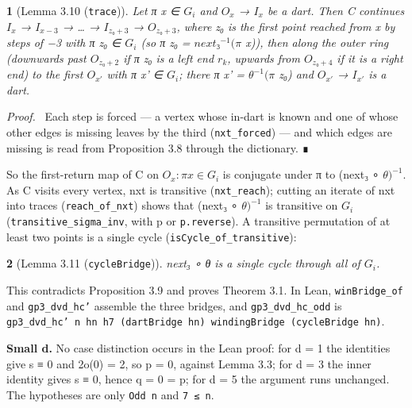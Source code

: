 \documentclass[11pt,a4paper]{article}
\theoremstyle{named}
\newtheorem*{namedthm}{}
\newenvironment{mdproof}[1][Proof]{\par\medskip\noindent\textit{#1.}\ }{\par\medskip}
\begin{document}
\begin{namedthm}[Lemma 3.10 (\texttt{trace})]
Let π x ∈ $G_i$ and $O_x$ → $I_x$ be a dart. Then C continues $I_x$ → $I_{x−3}$ → … → $I_{z₀+3}$ → $O_{z₀+3}$, where z₀ is the first point reached from x by steps of −3 with π z₀ ∈ $G_i$ (so π z₀ = $next₃^{−1}(π$ x)), then along the outer ring (downwards past $O_{z₀+2}$ if π z₀ is a left end $r_k$, upwards from $O_{z₀+4}$ if it is a right end) to the first $O_{x'}$ with π x' ∈ $G_i$; there π x' = $θ^{−1}(π$ z₀) and $O_{x'}$ → $I_{x'}$ is a dart.
\end{namedthm}
\begin{mdproof}[Proof]
Each step is forced — a vertex whose in-dart is known and one of whose other edges is missing leaves by the third (\texttt{nxt\_\allowbreak{}forced}) — and which edges are missing is read from Proposition 3.8 through the dictionary. ∎
\end{mdproof}

So the first-return map of C on ${O_x : π x ∈ G_i}$ is conjugate under π to (next₃ ∘ $θ)^{−1}$. As C visits every vertex, nxt is transitive (\texttt{nxt\_\allowbreak{}reach}); cutting an iterate of nxt into traces (\texttt{reach\_\allowbreak{}of\_\allowbreak{}nxt}) shows that (next₃ ∘ $θ)^{−1}$ is transitive on $G_i$ (\texttt{transitive\_\allowbreak{}sigma\_\allowbreak{}inv}, with p or \texttt{p.\allowbreak{}reverse}). A transitive permutation of at least two points is a single cycle (\texttt{isCycle\_\allowbreak{}of\_\allowbreak{}transitive}):

\begin{namedthm}[Lemma 3.11 (\texttt{cycleBridge})]
next₃ ∘ θ is a single cycle through all of $G_i$.
\end{namedthm}

This contradicts Proposition 3.9 and proves Theorem 3.1. In Lean, \texttt{winBridge\_\allowbreak{}of} and \texttt{gp3\_\allowbreak{}dvd\_\allowbreak{}hc'} assemble the three bridges, and \texttt{gp3\_\allowbreak{}dvd\_\allowbreak{}hc\_\allowbreak{}odd} is \texttt{gp3\_\allowbreak{}dvd\_\allowbreak{}hc'\ \allowbreak{}n\ \allowbreak{}hn\ \allowbreak{}h7\ \allowbreak{}(dartBridge\ \allowbreak{}hn)\ \allowbreak{}windingBridge\ \allowbreak{}(cycleBridge\ \allowbreak{}hn)}.

\textbf{Small d.} No case distinction occurs in the Lean proof: for d = 1 the identities give s ≡ 0 and 2\textbar{}o(0)\textbar{} = 2, so p = 0, against Lemma 3.3; for d = 3 the inner identity gives s ≡ 0, hence q = 0 = p; for d = 5 the argument runs unchanged. The hypotheses are only \texttt{Odd\ \allowbreak{}n} and \texttt{7\ \allowbreak{}≤\ \allowbreak{}n}.
\end{document}
